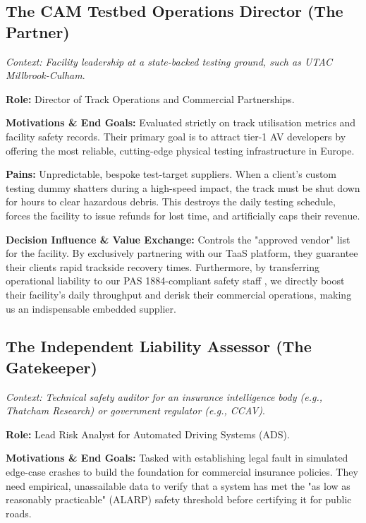 \subsection{The CAM Testbed Operations Director (The Partner)}

\textit{Context: Facility leadership at a state-backed testing ground, such as UTAC Millbrook-Culham}.

\textbf{Role:} Director of Track Operations and Commercial Partnerships.

\textbf{Motivations \& End Goals:} Evaluated strictly on track utilisation metrics and facility safety records. Their primary goal is to attract tier-1 AV developers by offering the most reliable, cutting-edge physical testing infrastructure in Europe.

\textbf{Pains:} Unpredictable, bespoke test-target suppliers. When a client's custom testing dummy shatters during a high-speed impact, the track must be shut down for hours to clear hazardous debris. This destroys the daily testing schedule, forces the facility to issue refunds for lost time, and artificially caps their revenue.

\textbf{Decision Influence \& Value Exchange:} Controls the "approved vendor" list for the facility. By exclusively partnering with our TaaS platform, they guarantee their clients rapid trackside recovery times. Furthermore, by transferring operational liability to our PAS 1884-compliant safety staff \cite{pas1884}, we directly boost their facility's daily throughput and derisk their commercial operations, making us an indispensable embedded supplier.

\subsection{The Independent Liability Assessor (The Gatekeeper)}

\textit{Context: Technical safety auditor for an insurance intelligence body (e.g., Thatcham Research) or government regulator (e.g., CCAV)}.

\textbf{Role:} Lead Risk Analyst for Automated Driving Systems (ADS).

\textbf{Motivations \& End Goals:} Tasked with establishing legal fault in simulated edge-case crashes to build the foundation for commercial insurance policies. They need empirical, unassailable data to verify that a system has met the "as low as reasonably practicable" (ALARP) safety threshold before certifying it for public roads.

